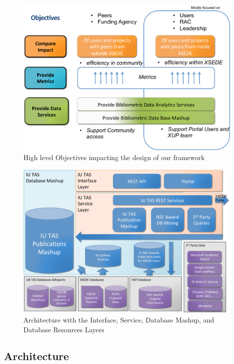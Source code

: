 \documentclass{sig-alternate}
\begin{document}
\begin{figure}[htb] 
  \centering 
    \includegraphics[width=1.0\columnwidth]{images-new/objectives.pdf} 
    \caption{High level Objectives impacting the design of our framework}
    \label{F:objectives}
\end{figure} 

\begin{figure}[htb] 
  \centering 
    \includegraphics[width=1.0\columnwidth]{images-new/architecture.pdf} 
  \caption{Architecture with the Interface, Service, Database Mashup,
    and Database Resources Layers}\label{F:architecture} 
\end{figure} 

\subsection{Architecture}
\end{document}
